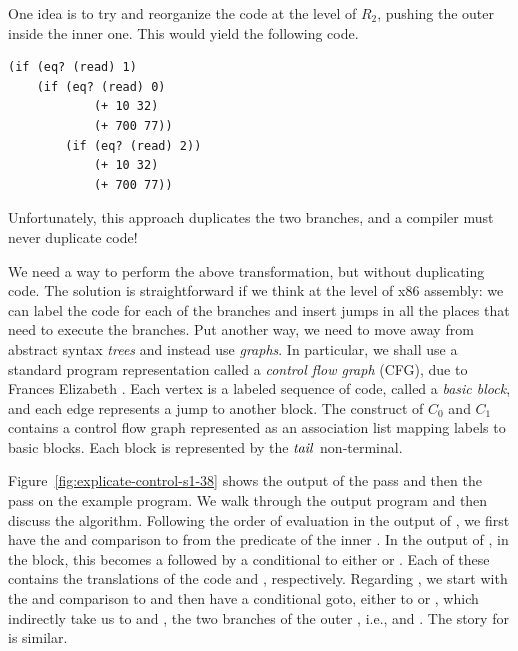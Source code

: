\documentclass[11pt]{book}
\begin{document}
One idea is to try and reorganize the code at the level of $R_2$,
pushing the outer  inside the inner one. This would yield the
following code.
\begin{center}
\begin{minipage}{0.96\textwidth}
\begin{lstlisting}
(if (eq? (read) 1)
    (if (eq? (read) 0)
            (+ 10 32)
            (+ 700 77))
        (if (eq? (read) 2))
            (+ 10 32)
            (+ 700 77))
\end{lstlisting}
\end{minipage}
\end{center}
Unfortunately, this approach duplicates the two branches, and a
compiler must never duplicate code!

We need a way to perform the above transformation, but without
duplicating code. The solution is straightforward if we think at the
level of x86 assembly: we can label the code for each of the branches
and insert jumps in all the places that need to execute the
branches. Put another way, we need to move away from abstract syntax
\emph{trees} and instead use \emph{graphs}. In particular, we shall
use a standard program representation called a \emph{control flow
  graph} (CFG), due to Frances Elizabeth \citet{Allen:1970uq}.  Each
vertex is a labeled sequence of code, called a \emph{basic block}, and
each edge represents a jump to another block. The 
construct of $C_0$ and $C_1$ contains a control flow graph represented
as an association list mapping labels to basic blocks. Each block is
represented by the $\mathit{tail}$ non-terminal.

Figure~\ref{fig:explicate-control-s1-38} shows the output of the
 pass and then the
 pass on the example program. We walk through
the output program and then discuss the algorithm.
%
Following the order of evaluation in the output of
, we first have the  and
comparison to  from the predicate of the inner .  In
the output of , in the  block,
this becomes a  followed by a conditional  to
either  or . Each of these contains the
translations of the code  and , respectively. Regarding , we start with the
 and comparison to  and then have a conditional
goto, either to  or , which indirectly
take us to  and , the two branches of the
outer , i.e.,  and . The
story for  is similar.
\end{document}
